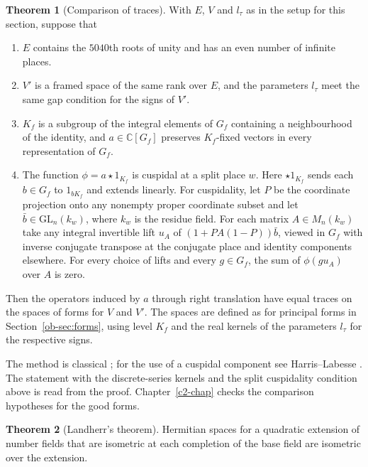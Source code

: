 \documentclass[reqno]{amsart}
\newcounter{chap}
\theoremstyle{definition}
\newtheorem{theorem}{Theorem}
\newcommand{\C}{\mathbb C}
\begin{document}
\begin{theorem}[Comparison of traces]\label{thm:traces}
With \(E\), \(V\) and \(l_\tau\) as in the setup for this section, suppose that
\begin{enumerate}
\item \(E\) contains the \(5040\)th roots of unity and has an even number of infinite places.
\item \(V'\) is a framed space of the same rank over \(E\), and the parameters \(l_\tau\) meet the same gap condition for the signs of \(V'\).
\item \(K_f\) is a subgroup of the integral elements of \(G_f\) containing a neighbourhood of the identity, and \(a\in\C[G_f]\) preserves \(K_f\)-fixed vectors in every representation of \(G_f\).
\item The function \(\phi=a\star 1_{K_f}\) is cuspidal at a split place \(w\). Here \(\star 1_{K_f}\) sends each \(b\in G_f\) to \(1_{bK_f}\) and extends linearly. For cuspidality, let \(P\) be the coordinate projection onto any nonempty proper coordinate subset and let \(\bar b\in\mathrm{GL}_n(k_w)\), where \(k_w\) is the residue field. For each matrix \(A\in M_n(k_w)\) take any integral invertible lift \(u_A\) of \((1+PA(1-P))\bar b\), viewed in \(G_f\) with inverse conjugate transpose at the conjugate place and identity components elsewhere. For every choice of lifts and every \(g\in G_f\), the sum of \(\phi(gu_A)\) over \(A\) is zero.
\end{enumerate}
Then the operators induced by \(a\) through right translation have equal traces on the spaces of forms for \(V\) and \(V'\). The spaces are defined as for principal forms in Section~\ref{ob-sec:forms}, using level \(K_f\) and the real kernels of the parameters \(l_\tau\) for the respective signs.
\end{theorem}

\noindent The method is classical \cite{AC,FK,Lab}; for the use of a cuspidal component see Harris--Labesse \cite[Proposition~1.10.5]{HL}. The statement with the discrete-series kernels and the split cuspidality condition above is read from the proof. Chapter~\ref{c2-chap} checks the comparison hypotheses for the good forms.

\begin{theorem}[Landherr's theorem]\label{thm:landherr}
Hermitian spaces for a quadratic extension of number fields that are isometric at each completion of the base field are isometric over the extension.
\end{theorem}
\end{document}
